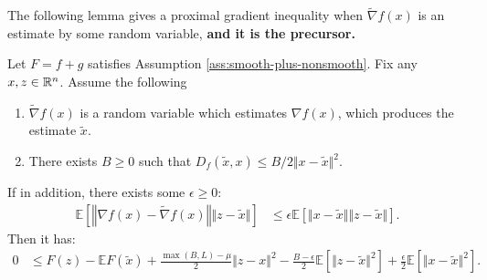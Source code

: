 \documentclass[12pt]{article}
\newcommand{\expect}{\ensuremath{\mathbb E}}
\begin{document}
        \par
        The following lemma gives a proximal gradient inequality when $\tilde \nabla f(x)$ is an estimate by some random variable, \textbf{and it is the precursor.} 
        \begin{lemma}\label{lemma:pg-stoch-ineq}
            Let $F = f + g$ satisfies Assumption \ref{ass:smooth-plus-nonsmooth}. 
            Fix any $x, z \in \mathbb R^n$. 
            Assume the following
            \begin{enumerate}[nosep]
                \item $\tilde \nabla f(x)$ is a random variable which estimates $\nabla f(x)$, which produces the estimate $\tilde x$. 
                \item There exists $B \ge 0$ such that $D_f(\tilde x,x)\le B/2 \Vert x - \tilde x\Vert^2$. 
            \end{enumerate}
            If in addition, there exists some $\epsilon \ge 0$: 
            \begin{align*}
                \expect \left[
                    \left\Vert \nabla f(x) - \tilde \nabla f(x)\right\Vert 
                    \Vert z - \tilde x\Vert
                \right] &\le 
                \epsilon \expect \left[
                    \Vert x - \tilde x\Vert\Vert z - \tilde x\Vert
                \right]. 
            \end{align*}
            Then it has: 
            \begin{align*}
                0 &\le 
                F(z) - \expect F(\tilde x) + \frac{\max(B, L) - \mu}{2} \Vert z - x\Vert^2
                - \frac{B - \epsilon}{2}\expect\left[\Vert z - \tilde x\Vert^2\right]
                + \frac{\epsilon}{2} \expect\left[\Vert x - \tilde x\Vert^2\right]. 
            \end{align*}
        \end{lemma}
\end{document}

